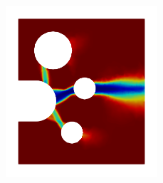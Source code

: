 \begin{frame}
\begin{columns}[T]
\begin{column}{0.6\textwidth}
\begin{figure}
\begin{subfigure}{0.32\textwidth}
          \includegraphics[width=0.62\textwidth]{examples/figures/M_3}
        \end{subfigure}
        

\end{figure}
\end{column}
\end{columns}
\end{frame}
